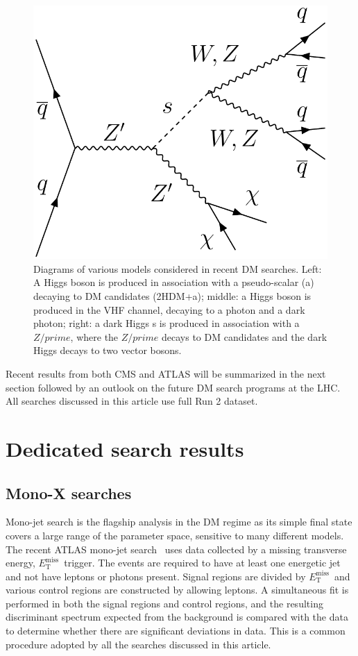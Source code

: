 \documentclass{moriond}
\def\et{E_\textrm{T}^{\textrm{miss}}}
\begin{document}
\begin{figure} [htb]
\begin{minipage}{0.32\linewidth}
\end{minipage}
\begin{minipage}{0.32\linewidth}
\centerline{\includegraphics[width=0.9\linewidth]{MonoSVVDiagram}}
\end{minipage}
\caption[]{Diagrams of various models considered in recent DM searches. Left: A Higgs boson is produced in association with a pseudo-scalar (a) decaying to DM candidates (2HDM+a); middle: a Higgs boson is produced in the VHF channel, decaying to a photon and a dark photon; right: a dark Higgs s is produced in association with a $Z/prime$, where the $Z/prime$ decays to DM candidates and the dark Higgs decays to two vector bosons.}
\label{fig:diagrams}
\end{figure}

Recent results from both CMS and ATLAS will be summarized in the next section
followed by an outlook on the future DM search programs at the LHC. All
searches discussed in this article use full Run 2 dataset. 

\section{Dedicated search results}

\subsection{Mono-X searches}

Mono-jet search is the flagship analysis in the DM regime as its simple final
state covers a large range of the parameter space, sensitive to many different
models. The recent ATLAS mono-jet search~\cite{monojet} uses data collected by a missing transverse energy, $\et$\,
trigger. The events are required to have at least one energetic jet and not
have leptons or photons present. Signal regions are divided by $\et$\ and various control regions are constructed by allowing leptons. A simultaneous fit is performed in both the signal regions and control regions, and the resulting discriminant spectrum expected from the background is compared with the data to determine whether there are significant deviations in data. This is a common procedure adopted by all the searches discussed in this article.
\end{document}
